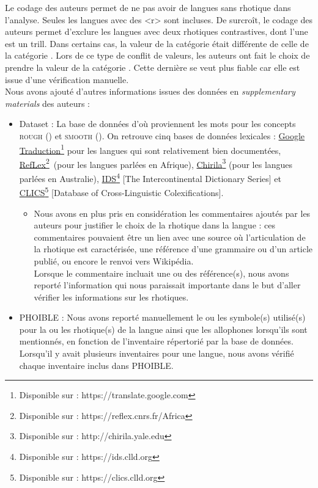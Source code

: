 Le codage des auteurs permet de ne pas avoir de langues sans rhotique dans l'analyse. Seules les langues avec des <r> sont incluses. De surcroît, le codage des auteurs permet d'exclure les langues avec deux rhotiques contrastives, dont l'une est un trill.
Dans certains cas, la valeur de la catégorie  était différente de celle de la catégorie . Lors de ce type de conflit de valeurs, les auteurs ont fait le choix de prendre la valeur de la catégorie . Cette dernière se veut plus fiable car elle est issue d'une vérification manuelle.\\

Nous avons ajouté d'autres informations issues des données en \textit{supplementary materials} des auteurs :

\begin{itemize}
	\item Dataset : La base de données d'où proviennent les mots pour les concepts \textsc{rough} () et \textsc{smooth} (). On retrouve cinq bases de données lexicales : \href{https://translate.google.com/?hl=fr&sl=auto&tl=en&op=translate}{Google Traduction\footnote{Disponible sur : \url{https://translate.google.com}}} pour les langues qui sont relativement bien documentées, \href{https://reflex.cnrs.fr/Africa/}{RefLex\footnote{Disponible sur : \url{https://reflex.cnrs.fr/Africa}}} (pour les langues parlées en Afrique), \href{http://chirila.yale.edu/}{Chirila\footnote{Disponible sur : \url{http://chirila.yale.edu}}} (pour les langues parlées en Australie), \href{https://ids.clld.org/}{IDS\footnote{Disponible sur : \url{https://ids.clld.org}}} [The Intercontinental Dictionary Series]  et \href{https://clics.clld.org/}{CLICS\footnote{Disponible sur : \url{https://clics.clld.org}}} [Database of Cross-Linguistic Colexifications].
	\begin{itemize}
		\item Nous avons en plus pris en considération les commentaires ajoutés par les auteurs pour justifier le choix de la rhotique dans la langue : ces commentaires pouvaient être un lien avec une source où l'articulation de la rhotique est caractérisée, une référence d'une grammaire ou d'un article publié, ou encore le renvoi vers Wikipédia.\\
		Lorsque le commentaire incluait une ou des référence(s), nous avons reporté l'information qui nous paraissait importante dans le but d'aller vérifier les informations sur les rhotiques.
	\end{itemize}
	\item PHOIBLE : Nous avons reporté manuellement le ou les symbole(s) utilisé(s) pour la ou les rhotique(s) de la langue ainsi que les allophones lorsqu'ils sont mentionnés, en fonction de l'inventaire répertorié par la base de données. Lorsqu'il y avait plusieurs inventaires pour une langue, nous avons vérifié chaque inventaire inclus dans PHOIBLE.

\end{itemize}
